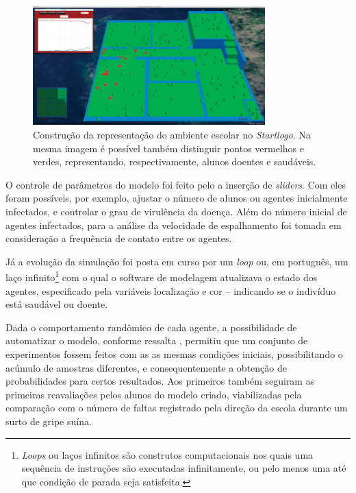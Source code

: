 \begin{figure}[!htb]
  \caption{Construção da representação do ambiente escolar no \textit{Startlogo}. Na mesma imagem é possível também distinguir pontos vermelhos e verdes, representando, respectivamente, alunos doentes e saudáveis.}
  \begin{center}
    \includegraphics[width=0.8\textwidth]{imagens/layout-starlogo}
  \end{center}
  \label{fig:starlogo}
\end{figure}

O controle de parâmetros do modelo foi feito pelo a inserção de \textit{sliders}. Com eles foram possíveis, por exemplo, ajustar o número de alunos ou agentes inicialmente infectados, e controlar o grau de virulência da doença. Além do número inicial de agentes infectados, para a análise da velocidade de espalhamento foi tomada em consideração a frequência de contato entre os agentes. 

Já a evolução da simulação foi posta em curso por um \textit{loop} ou, em português, um laço infinito\footnote{\textit{Loops} ou laços infinitos são construtos computacionais nos quais uma sequência de instruções são executadas infinitamente, ou pelo menos uma até que condição de parada seja satisfeita.} com o qual o software de modelagem atualizava o estado dos agentes, especificado pela variáveis localização e cor -- indicando se o indivíduo está saudável ou doente. 

Dada o comportamento randômico de cada agente, a possibilidade de automatizar o modelo, conforme ressalta , permitiu que um conjunto de experimentos fossem feitos com as as mesmas condições iniciais, possibilitando o acúmulo de amostras diferentes, e consequentemente a obtenção de probabilidades para certos resultados. Aos primeiros também seguiram as primeiras reavaliações pelos alunos do modelo criado, viabilizadas pela comparação com o número de faltas registrado pela direção da escola durante um surto de gripe suína. 


